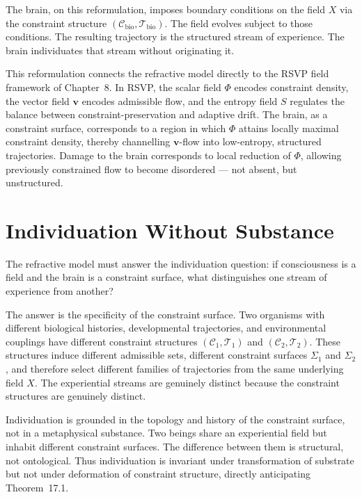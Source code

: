 \documentclass[11pt,openany]{book}
\begin{document}
The brain, on this reformulation, imposes boundary
conditions on the field $X$ via the constraint structure
$(\mathcal{C}_{\mathrm{bio}}, \mathcal{T}_{\mathrm{bio}})$.
The field evolves subject to those conditions.  The
resulting trajectory is the structured stream of experience.
The brain individuates that stream without originating it.

This reformulation connects the refractive model directly
to the RSVP field framework of Chapter~8.  In RSVP, the
scalar field $\Phi$ encodes constraint density, the vector
field $\boldsymbol{v}$ encodes admissible flow, and the
entropy field $S$ regulates the balance between
constraint-preservation and adaptive drift.  The brain, as
a constraint surface, corresponds to a region in which
$\Phi$ attains locally maximal constraint density, thereby
channelling $\boldsymbol{v}$-flow into low-entropy,
structured trajectories.  Damage to the brain corresponds
to local reduction of $\Phi$, allowing previously
constrained flow to become disordered --- not absent, but
unstructured.

\section{Individuation Without Substance}
\label{sec:individuation}

The refractive model must answer the individuation
question: if consciousness is a field and the brain is a
constraint surface, what distinguishes one stream of
experience from another?

The answer is the specificity of the constraint surface.
Two organisms with different biological histories,
developmental trajectories, and environmental couplings
have different constraint structures
$(\mathcal{C}_1, \mathcal{T}_1)$ and
$(\mathcal{C}_2, \mathcal{T}_2)$.  These structures induce
different admissible sets, different constraint surfaces
$\Sigma_1$ and $\Sigma_2$, and therefore select different
families of trajectories from the same underlying field
$X$.  The experiential streams are genuinely distinct
because the constraint structures are genuinely distinct.

Individuation is grounded in the topology and history of
the constraint surface, not in a metaphysical substance.
Two beings share an experiential field but inhabit
different constraint surfaces.  The difference between them
is structural, not ontological.  Thus individuation is
invariant under transformation of substrate but not under
deformation of constraint structure, directly anticipating
Theorem~17.1.
\end{document}
